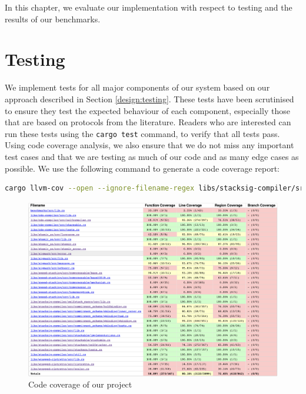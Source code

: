
In this chapter, we evaluate our implementation with respect to testing and
the results of our benchmarks. 

\section{Testing}\label{eval:testing}
We implement tests for all major components of our system based on our approach 
described in Section \ref{design:testing}. These tests have been scrutinised to ensure 
they test the expected behaviour of each component, especially those 
that are based on protocols from the literature. Readers who are interested can 
run these tests using the \texttt{cargo test} command, to verify that all tests pass. 
Using code coverage analysis, we also ensure that we do not miss any important test 
cases and that we are testing as much of our code and as many edge cases as possible.
We use the following command to generate a code coverage report:

\begin{lstlisting}[language=bash]
  cargo llvm-cov --open --ignore-filename-regex libs/stacksig-compiler/src/rot256
\end{lstlisting}

\begin{figure}[t]
  \centering
  \includegraphics[width=\linewidth]{../assets/code-coverage.png}
  \caption{Code coverage of our project}
  \label{fig:coverage}
\end{figure}

